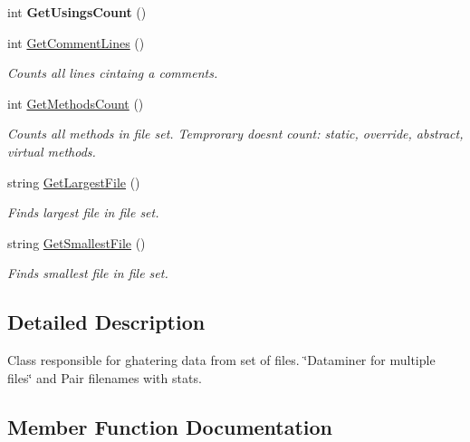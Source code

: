 \begin{DoxyCompactItemize}
int {\bfseries Get\+Usings\+Count} ()
\item 
int \mbox{\hyperlink{class_code_analizer_1_1_analizer_aa1c5078ca9d05746785e071c8c9200f6}{Get\+Comment\+Lines}} ()
\begin{DoxyCompactList}\small\item\em Counts all lines cintaing a comments. \end{DoxyCompactList}\item 
int \mbox{\hyperlink{class_code_analizer_1_1_analizer_ac11fc64eb4af5e8470c1c25d1dcb48e2}{Get\+Methods\+Count}} ()
\begin{DoxyCompactList}\small\item\em Counts all methods in file set. Temprorary doesnt count\+: static, override, abstract, virtual methods. \end{DoxyCompactList}\item 
string \mbox{\hyperlink{class_code_analizer_1_1_analizer_a05eb6e6a5592ea98f04b8cd3a146b329}{Get\+Largest\+File}} ()
\begin{DoxyCompactList}\small\item\em Finds largest file in file set. \end{DoxyCompactList}\item 
string \mbox{\hyperlink{class_code_analizer_1_1_analizer_ac3fb4201ac5fbb69662fcc983c435f41}{Get\+Smallest\+File}} ()
\begin{DoxyCompactList}\small\item\em Finds smallest file in file set. \end{DoxyCompactList}\end{DoxyCompactItemize}


\subsection{Detailed Description}
Class responsible for ghatering data from set of files. \char`\"{}\+Dataminer for multiple files\char`\"{} and Pair filenames with stats. 



\subsection{Member Function Documentation}
\mbox{\label{class_code_analizer_1_1_analizer_a9a16d095345306736f2e7adc3d95a1c8}} 
